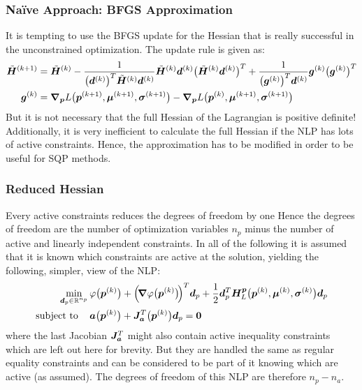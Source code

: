 			\subsubsection{Na{\"i}ve Approach: BFGS Approximation}
				It is tempting to use the BFGS update for the Hessian that is really successful in the unconstrained optimization. The update rule is given as:
				\begin{align*}
					\tilde{\bm{H}}^{(k + 1)} &= \tilde{\bm{H}}^{(k)}
						- \frac{1}{\big(\bm{d}^{(k)}\big)^T \tilde{\bm{H}}^{(k)} \bm{d}^{(k)}} \tilde{\bm{H}}^{(k)} \bm{d}^{(k)} \big(\tilde{\bm{H}}^{(k)} \bm{d}^{(k)}\big)^T
						+ \frac{1}{\big(\bm{g}^{(k)}\big)^T \bm{d}^{(k)}} \bm{g}^{(k)} \big(\bm{g}^{(k)}\big)^T \\
					\bm{g}^{(k)} &= \grad_{\bm{p}}L\big(\bm{p}^{(k + 1)}, \bm{\mu}^{(k + 1)}, \bm{\sigma}^{(k + 1)}\big) - \grad_{\bm{p}}L\big(\bm{p}^{(k)}, \bm{\mu}^{(k + 1)}, \bm{\sigma}^{(k + 1)}\big)
				\end{align*}
				But it is not necessary that the full Hessian of the Lagrangian is positive definite! Additionally, it is very inefficient to calculate the full Hessian if the NLP has lots of active constraints. Hence, the approximation has to be modified in order to be useful for SQP methods.

			\subsubsection{Reduced Hessian} %
				Every active constraints reduces the degrees of freedom by one Hence the degrees of freedom are the number of optimization variables \(n_p\) minus the number of active and linearly independent constraints. In all of the following it is assumed that it is known which constraints are active at the solution, yielding the following, simpler, view of the NLP:
				\begin{align}
					\min_{\bm{d}_p \in \mathbb{R}^{n_p}} &\, \varphi\big(\bm{p}^{(k)}\big) + \Big(\!\grad{\varphi}\big(\bm{p}^{(k)}\big)\!\Big)^T \bm{d}_p + \frac{1}{2} \bm{d}_p^T \bm{H}_L^{\bm{p}}\big(\bm{p}^{(k)}, \bm{\mu}^{(k)}, \bm{\sigma}^{(k)}\big) \bm{d}_p \\
					\mathrm{subject~to}\quad &\,
						\begin{alignedat}[t]{2}
							\bm{a}\big(\bm{p}^{(k)}\big) + \bm{J}_{\bm{a}}^T\big(\bm{p}^{(k)}\big) \bm{d}_p &= \bm{0}
						\end{alignedat}  \label{eq:activeQp}
				\end{align}
				where the last Jacobian \( \bm{J}_{\bm{a}}^T \) might also contain active inequality constraints which are left out here for brevity. But they are handled the same as regular equality constraints and can be considered to be part of it knowing which are active (as assumed). The degrees of freedom of this NLP are therefore \( n_p - n_a \).

